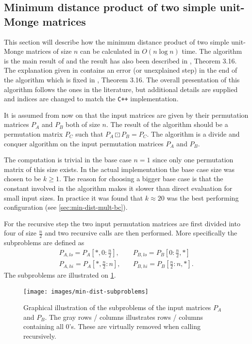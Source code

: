 \documentclass[twoside,11pt,openright]{report}
\newcommand{\refbook}[2]{\cite[#1]{DBLP:journals/corr/abs-0707-3619}, #2}
\begin{document}
\subsection{Minimum distance product of two simple unit-Monge matrices}
\label{sec:algorithm:min-mult-two-unit-monge}
This section will describe how the minimum distance product of two simple unit-Monge matrices of size $n$ can be calculated in $O(n\log{n})$ time. The algorithm is the main result of \cite{Tiskin:2010:FDM:1873601.1873704} and the result has also been described in \refbook{p. 28}{Theorem 3.16}. The explanation given in \cite{Tiskin:2010:FDM:1873601.1873704} contains an error (or unexplained step) in the end of the algorithm which is fixed in \refbook{p. 28}{Theorem 3.16}. The overall presentation of this algorithm follows the ones in the literature, but additional details are supplied and indices are changed to match the \texttt{C++} implementation.

It is assumed from now on that the input matrices are given by their permutation matrices $P_A$ and $P_B$ both of size $n$. The result of the algorithm should be a permutation matrix $P_C$ such that $P_A \boxdot P_B = P_C$. The algorithm is a divide and conquer algorithm on the input permutation matrices $P_A$ and $P_B$.

The computation is trivial in the base case $n = 1$ since only one permutation matrix of this size exists. In the actual implementation the base case size was chosen to be $k \geq 1$. The reason for choosing a bigger base case is that the constant involved in the algorithm makes it slower than direct evaluation for small input sizes. In practice it was found that $k \approx 20$ was the best performing configuration (see \cref{sec:min-dist-mult-bc}).

For the recursive step the two input permutation matrices are first divided into four of size $\frac{n}{2}$ and two recursive calls are then performed. More specifically the subproblems are defined as
\begin{align*}
  P_{A,lo} = P_A\left[*, 0 : \frac{n}{2}\right], \quad &P_{B,lo} = P_B\left[0 : \frac{n}{2}, *\right] \\
  P_{A,hi} = P_A\left[*, \frac{n}{2} : n\right], \quad &P_{B,hi} = P_B\left[\frac{n}{2} : n, *\right].
\end{align*}
The subproblems are illustrated on \cref{fig:min-mult:subproblems}.
\begin{figure}[!htb]
  \centering
  \texttt{[image: images/min-dist-subproblems]}
  \caption{Graphical illustration of the subproblems of the input matrices $P_A$ and $P_B$. The gray rows / columns illustrates rows / columns containing all $0$'s. These are virtually removed when calling recursively.}
  \label{fig:min-mult:subproblems}
\end{figure}
\end{document}
